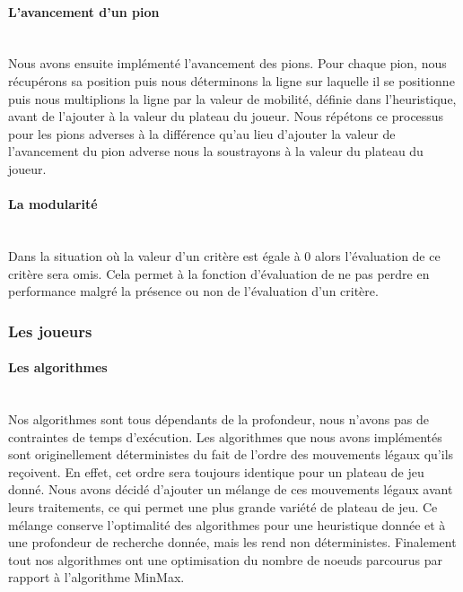 \huge\documentclass{article}
\begin{document}
\paragraph{L'avancement d'un pion}
~~\\
\newline
Nous avons ensuite implémenté l'avancement des pions. Pour chaque pion, nous récupérons sa position puis nous déterminons la ligne sur laquelle il se positionne puis nous multiplions la ligne par la valeur de mobilité, définie dans l'heuristique, avant de l'ajouter à la valeur du plateau du joueur. Nous répétons ce processus pour les pions adverses à la différence qu'au lieu d'ajouter la valeur de l'avancement du pion adverse nous la soustrayons à la valeur du plateau du joueur. 
\paragraph{La modularité}
~~\\
\newline
Dans la situation où la valeur d'un critère est égale à 0 alors l'évaluation de ce critère sera omis.
Cela permet à la fonction d'évaluation de ne pas perdre en performance malgré la présence ou non de l'évaluation d'un critère. 

\subsubsection{Les joueurs}\label{player_architecture}

\paragraph{Les algorithmes}
~~\\
\newline
Nos algorithmes sont tous dépendants de la profondeur, nous n'avons pas de contraintes de temps d'exécution. \newline
Les algorithmes que nous avons implémentés sont originellement déterministes du fait de l'ordre des mouvements légaux qu'ils reçoivent. En effet, cet ordre sera toujours identique pour un plateau de jeu donné. 
Nous avons décidé d'ajouter un mélange de ces mouvements légaux avant leurs traitements, ce qui permet une plus grande variété de plateau de jeu. Ce mélange conserve l'optimalité des algorithmes pour une heuristique donnée et à une profondeur de recherche donnée, mais les rend non déterministes.
Finalement tout nos algorithmes ont une optimisation du nombre de noeuds parcourus par rapport à l'algorithme MinMax.
\end{document}
